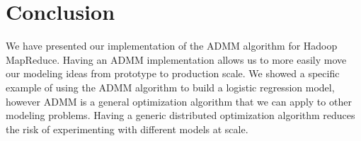 \documentclass[10pt, conference, compsocconf]{IEEEtran}
\begin{document}
\section{Conclusion}\label{sec:conc}
We have presented our implementation of the ADMM algorithm for Hadoop MapReduce.  Having an ADMM implementation allows us to more easily move our modeling ideas from prototype to production scale.  We showed a specific example of using the ADMM algorithm to build a logistic regression model, however ADMM is a general optimization algorithm that we can apply to other modeling problems.  Having a generic distributed optimization algorithm reduces the risk of experimenting with different models at scale.











%



\end{document}
